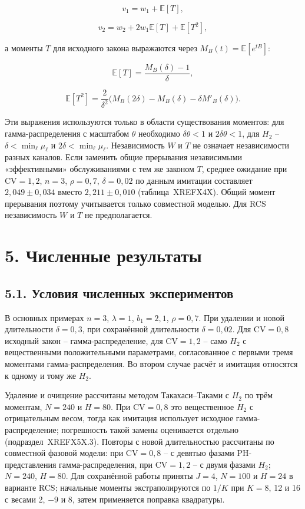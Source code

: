 \[v_1=w_1+\mathbb E[T],\]

\[v_2=w_2+2w_1\mathbb E[T]+\mathbb E[T^2],\]


а моменты \(T\) для исходного закона выражаются через \(M_B(t)=\mathbb E[e^{tB}]\):


\[\mathbb E[T]=\frac{M_B(\delta)-1}{\delta},\]

\[\mathbb E[T^2]=\frac{2}{\delta^2}\bigl(M_B(2\delta)-M_B(\delta)-\delta M'_B(\delta)\bigr).\]


Эти выражения используются только в области существования моментов: для гамма-распределения с масштабом \(\theta\) необходимо \(\delta\theta<1\) и \(2\delta\theta<1\), для \(H_2\) -- \(\delta<\min_\ell\mu_\ell\) и \(2\delta<\min_\ell\mu_\ell\). Независимость \(W\) и \(T\) не означает независимости разных каналов. Если заменить общие прерывания независимыми «эффективными» обслуживаниями с тем же законом \(T\), среднее ожидание при \(\mathrm{CV}=1{,}2\), \(n=3\), \(\rho=0{,}7\), \(\delta=0{,}02\) по данным имитации составляет \(2{,}049\pm0{,}034\) вместо \(2{,}211\pm0{,}010\) (таблица~XREFX4X). Общий момент прерывания поэтому учитывается только совместной моделью. Для RCS независимость \(W\) и \(T\) не предполагается.

\section*{5. Численные результаты}
\subsection*{5.1. Условия численных экспериментов}
В основных примерах \(n=3\), \(\lambda=1\), \(b_1=2{,}1\), \(\rho=0{,}7\). При удалении и новой длительности \(\delta=0{,}3\), при сохранённой длительности \(\delta=0{,}02\). Для \(\mathrm{CV}=0{,}8\) исходный закон -- гамма-распределение, для \(\mathrm{CV}=1{,}2\) -- само \(H_2\) с вещественными положительными параметрами, согласованное с первыми тремя моментами гамма-распределения. Во втором случае расчёт и имитация относятся к одному и тому же \(H_2\).

Удаление и очищение рассчитаны методом Такахаси--Таками с \(H_2\) по трём моментам, \(N=240\) и \(H=80\). При \(\mathrm{CV}=0{,}8\) это вещественное \(H_2\) с отрицательным весом, тогда как имитация использует исходное гамма-распределение; погрешность такой замены оценивается отдельно (подраздел~XREFX5X.3). Повторы с новой длительностью рассчитаны по совместной фазовой модели: при \(\mathrm{CV}=0{,}8\) -- с девятью фазами PH-представления гамма-распределения, при \(\mathrm{CV}=1{,}2\) -- с двумя фазами \(H_2\); \(N=240\), \(H=80\). Для сохранённой работы приняты \(J=4\), \(N=100\) и \(H=24\) в варианте RCS; начальные моменты экстраполируются по \(1/K\) при \(K=8\), 12 и 16 с весами 2, \(-9\) и 8, затем применяется поправка квадратуры.

